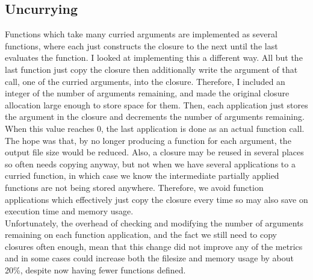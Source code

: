 \subsection{Uncurrying}
Functions which take many curried arguments are implemented as several functions, where each just constructs the closure to the next until the last evaluates the function. I looked at implementing this a different way. All but the last function just copy the closure then additionally write the argument of that call, one of the curried arguments, into the closure. Therefore, I included an integer of the number of arguments remaining, and made the original closure allocation large enough to store space for them. Then, each application just stores the argument in the closure and decrements the number of arguments remaining. When this value reaches 0, the last application is done as an actual function call. \\
The hope was that, by no longer producing a function for each argument, the output file size would be reduced. Also, a closure may be reused in several places so often needs copying anyway, but not when we have several applications to a curried function, in which case we know the intermediate partially applied functions are not being stored anywhere. Therefore, we avoid function applications which effectively just copy the closure every time so may also save on execution time and memory usage. \\
Unfortunately, the overhead of checking and modifying the number of arguments remaining on each function application, and the fact we still need to copy closures often enough, mean that this change did not improve any of the metrics and in some cases could increase both the filesize and memory usage by about 20\%, despite now having fewer functions defined.

